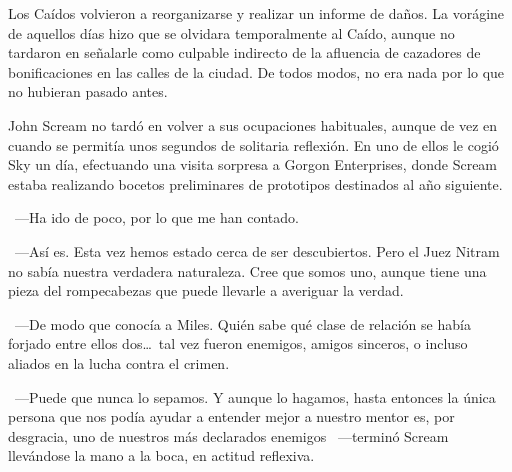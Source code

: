 Los Caídos volvieron a reorganizarse y realizar un informe de daños. La vorágine de aquellos días hizo que se olvidara temporalmente al Caído, aunque no tardaron en señalarle como culpable indirecto de la afluencia de cazadores de bonificaciones en las calles de la ciudad. De todos modos, no era nada por lo que no hubieran pasado antes.

John Scream no tardó en volver a sus ocupaciones habituales, aunque de vez en cuando se permitía unos segundos de solitaria reflexión. En uno de ellos le cogió Sky un día, efectuando una visita sorpresa a Gorgon Enterprises, donde Scream estaba realizando bocetos preliminares de prototipos destinados al año siguiente.

~---Ha ido de poco, por lo que me han contado.

~---Así es. Esta vez hemos estado cerca de ser descubiertos. Pero el Juez Nitram no sabía nuestra verdadera naturaleza. Cree que somos uno, aunque tiene una pieza del rompecabezas que puede llevarle a averiguar la verdad.

~---De modo que conocía a Miles. Quién sabe qué clase de relación se había forjado entre ellos dos\dots\ tal vez fueron enemigos, amigos sinceros, o incluso aliados en la lucha contra el crimen.

~---Puede que nunca lo sepamos. Y aunque lo hagamos, hasta entonces la única persona que nos podía ayudar a entender mejor a nuestro mentor es, por desgracia, uno de nuestros más declarados enemigos ~---terminó Scream llevándose la mano a la boca, en actitud reflexiva.

\endinput
